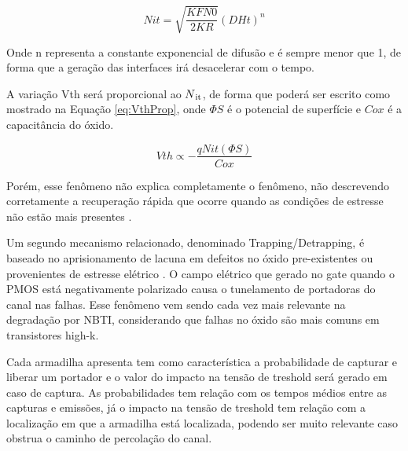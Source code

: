 \begin{equation}
    \label{eq:ResultanteRD}
    N{\scriptstyle it} = \sqrt{\frac{K{\scriptstyle F}N{\scriptstyle 0}}{2K{\scriptstyle R}}}(D{\scriptstyle H}t)^{n}
\end{equation}

Onde n representa a constante exponencial de difusão e é sempre menor que 1, de forma que a geração das interfaces irá desacelerar com o tempo.

A variação Vth será proporcional ao $N\textsubscript{it}$, de forma que poderá ser escrito como mostrado na Equação \ref{eq:VthProp}, onde $\Phi\scriptstyle{S}$ é o potencial de superfície e $C{\scriptstyle ox}$ é a capacitância do óxido.

\begin{equation}
    \label{eq:VthProp}
    V{\scriptstyle th} \propto - \frac{qN{\scriptstyle it}(\Phi{\scriptstyle S})}{C{\scriptstyle ox}}
\end{equation}

Porém, esse fenômeno não explica completamente o fenômeno, não descrevendo corretamente a recuperação rápida que ocorre quando as condições de estresse não estão mais presentes \cite{Gilson}.

Um segundo mecanismo relacionado, denominado Trapping/Detrapping, é baseado no aprisionamento de lacuna em defeitos no óxido pre-existentes ou provenientes de estresse elétrico \cite{Butzen}. O campo elétrico que gerado no gate quando o PMOS está negativamente polarizado causa o tunelamento de portadoras do canal nas falhas. Esse fenômeno vem sendo cada vez mais relevante na degradação por NBTI, considerando que falhas no óxido são mais comuns em transistores high-k.

Cada armadilha apresenta tem como característica a probabilidade de capturar e liberar um portador e o valor do impacto na tensão de treshold será gerado em caso de captura. As probabilidades tem relação com os tempos médios entre as capturas e emissões, já o impacto na tensão de treshold tem relação com a localização em que a armadilha está localizada, podendo ser muito relevante caso obstrua o caminho de percolação do canal. 


